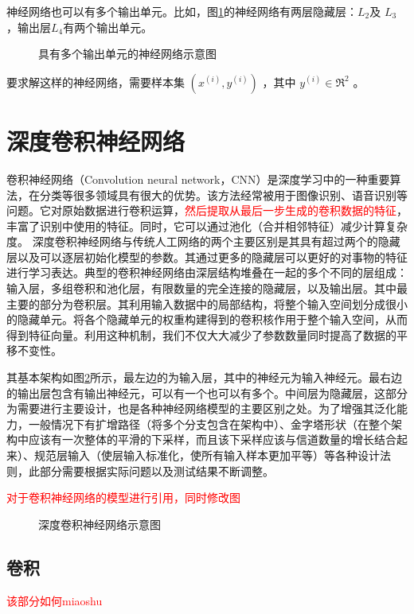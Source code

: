 神经网络也可以有多个输出单元。比如，图\ref{fig:network2}的神经网络有两层隐藏层：$  L_2 $及 $ L_3$ ，输出层$  L_4 $有两个输出单元。

\begin{figure}
  \centering
  
  \caption{具有多个输出单元的神经网络示意图}
  \label{fig:network2}  
\end{figure}

要求解这样的神经网络，需要样本集  $ (x^{(i)}, y^{(i)})$ ，其中 $ y^{(i)} \in \Re^2$ 。
\section{深度卷积神经网络}
卷积神经网络（Convolution neural network，CNN）是深度学习中的一种重要算法，在分类等很多领域具有很大的优势。该方法经常被用于图像识别、语音识别等问题。它对原始数据进行卷积运算，\textcolor{red}{然后提取从最后一步生成的卷积数据的特征}，丰富了识别中使用的特征。同时，它可以通过池化（合并相邻特征）减少计算复杂度。
深度卷积神经网络与传统人工网络的两个主要区别是其具有超过两个的隐藏层以及可以逐层初始化模型的参数。其通过更多的隐藏层可以更好的对事物的特征进行学习表达。典型的卷积神经网络由深层结构堆叠在一起的多个不同的层组成：输入层，多组卷积和池化层，有限数量的完全连接的隐藏层，以及输出层。其中最主要的部分为卷积层。其利用输入数据中的局部结构，将整个输入空间划分成很小的隐藏单元。将各个隐藏单元的权重构建得到的卷积核作用于整个输入空间，从而得到特征向量。利用这种机制，我们不仅大大减少了参数数量同时提高了数据的平移不变性。
  
其基本架构如图\ref{fig:cnn_network}所示，最左边的为输入层，其中的神经元为输入神经元。最右边的输出层包含有输出神经元，可以有一个也可以有多个。中间层为隐藏层，这部分为需要进行主要设计，也是各种神经网络模型的主要区别之处。为了增强其泛化能力，一般情况下有扩增路径（将多个分支包含在架构中）、金字塔形状（在整个架构中应该有一次整体的平滑的下采样，而且该下采样应该与信道数量的增长结合起来）、规范层输入（使层输入标准化，使所有输入样本更加平等）等各种设计法则，此部分需要根据实际问题以及测试结果不断调整。

\textcolor{red}{对于卷积神经网络的模型进行引用，同时修改图}
\begin{figure}
  \centering
  
  \caption{深度卷积神经网络示意图}
  \label{fig:cnn_network}  
\end{figure}

\subsection{卷积}
\textcolor{red}{该部分如何miaoshu}

